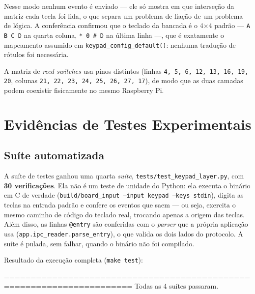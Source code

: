 \documentclass[12pt,a4paper]{article}
\begin{document}

\noindent
Nesse modo nenhum evento é enviado --- ele só mostra em que interseção da
matriz cada tecla foi lida, o que separa um problema de fiação de um problema
de lógica. A conferência confirmou que o teclado da bancada é o 4$\times$4
padrão --- \texttt{A B C D} na quarta coluna, \texttt{* 0 \# D} na última
linha ---, que é exatamente o mapeamento assumido em
\texttt{keypad\_config\_default()}: nenhuma tradução de rótulos foi
necessária.

A matriz de \emph{reed switches} usa pinos distintos (linhas
\texttt{4, 5, 6, 12, 13, 16, 19, 20}, colunas \texttt{21, 22, 23, 24, 25, 26,
27, 17}), de modo que as duas camadas podem coexistir fisicamente no mesmo
Raspberry Pi.

\section{Evidências de Testes Experimentais}
\label{sec:testes}

\subsection{Suíte automatizada}

A suíte de testes ganhou uma quarta \emph{suite},
\texttt{tests/test\_keypad\_layer.py}, com \textbf{30 verificações}. Ela não é
um teste de unidade do Python: ela executa o binário em C de verdade
(\texttt{build/board\_input --input keypad --keys stdin}), digita as teclas na
entrada padrão e confere os eventos que saem --- ou seja, exercita o mesmo
caminho de código do teclado real, trocando apenas a origem das teclas. Além
disso, as linhas \texttt{@entry} são conferidas com o \emph{parser} que a
própria aplicação usa (\texttt{app.ipc\_reader.parse\_entry}), o que valida os
dois lados do protocolo. A suíte é pulada, sem falhar, quando o binário não
foi compilado.

Resultado da execução completa (\texttt{make test}):

\begin{terminal}
======================================================================
Todas as 4 suítes passaram.
\end{terminal}
\end{document}
